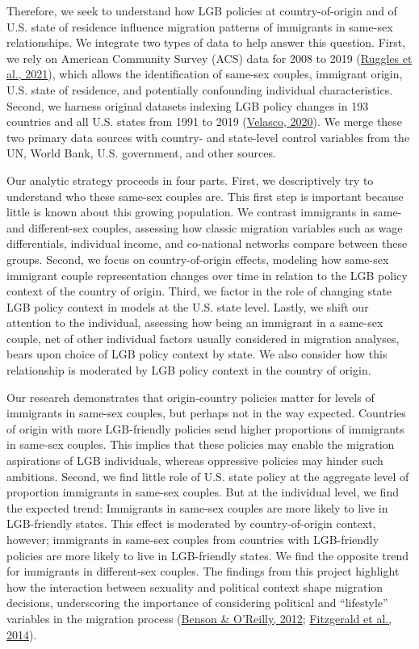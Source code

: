 \documentclass[
  11pt,
]{article}
\begin{document}
Therefore, we seek to understand how LGB policies at country-of-origin and of U.S. state of residence influence migration patterns of immigrants in same-sex relationships. We integrate two types of data to help answer this question. First, we rely on American Community Survey (ACS) data for 2008 to 2019 (\protect\hyperlink{ref-ruggles_2021}{Ruggles et al., 2021}), which allows the identification of same-sex couples, immigrant origin, U.S. state of residence, and potentially confounding individual characteristics. Second, we harness original datasets indexing LGB policy changes in 193 countries and all U.S. states from 1991 to 2019 (\protect\hyperlink{ref-velasco_2020}{Velasco, 2020}). We merge these two primary data sources with country- and state-level control variables from the UN, World Bank, U.S. government, and other sources.

Our analytic strategy proceeds in four parts. First, we descriptively try to understand who these same-sex couples are. This first step is important because little is known about this growing population. We contrast immigrants in same- and different-sex couples, assessing how classic migration variables such as wage differentials, individual income, and co-national networks compare between these groups. Second, we focus on country-of-origin effects, modeling how same-sex immigrant couple representation changes over time in relation to the LGB policy context of the country of origin. Third, we factor in the role of changing state LGB policy context in models at the U.S. state level. Lastly, we shift our attention to the individual, assessing how being an immigrant in a same-sex couple, net of other individual factors usually considered in migration analyses, bears upon choice of LGB policy context by state. We also consider how this relationship is moderated by LGB policy context in the country of origin.

Our research demonstrates that origin-country policies matter for levels of immigrants in same-sex couples, but perhaps not in the way expected. Countries of origin with more LGB-friendly policies send higher proportions of immigrants in same-sex couples. This implies that these policies may enable the migration aspirations of LGB individuals, whereas oppressive policies may hinder such ambitions. Second, we find little role of U.S. state policy at the aggregate level of proportion immigrants in same-sex couples. But at the individual level, we find the expected trend: Immigrants in same-sex couples are more likely to live in LGB-friendly states. This effect is moderated by country-of-origin context, however; immigrants in same-sex couples from countries with LGB-friendly policies are more likely to live in LGB-friendly states. We find the opposite trend for immigrants in different-sex couples. The findings from this project highlight how the interaction between sexuality and political context shape migration decisions, underscoring the importance of considering political and ``lifestyle'' variables in the migration process (\protect\hyperlink{ref-benson_2012}{Benson \& O'Reilly, 2012}; \protect\hyperlink{ref-fitzgerald_2014}{Fitzgerald et al., 2014}).
\end{document}
